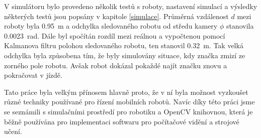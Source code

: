\documentclass[twoside]{ctuthesis}
\theoremstyle{plain}
\theoremstyle{definition}
\theoremstyle{note}
\begin{document}
V simulátoru bylo provedeno několik testů s roboty, nastavení simulací a výsledky některých testů jsou popsány v kapitole \ref{simulace}. Průměrná vzdálenost $d$ mezi roboty byla \SI{0.95}{\meter} a odchylka sledovaného robotu od středu kamery $\phi$ stanovila \SI{0.0023}{\radian}. Dále byl spočítán rozdíl mezi reálnou a vypočtenou pomocí Kalmanova filtru polohou sledovaného robotu, ten stanovil \SI{0.32}{\meter}. Tak velká odchylka byla způsobena tím, že byly simulovány situace, kdy značka zmizí ze zorného pole robotu. Avšak robot dokázal pokaždé najít značku znovu a pokračovat v jízdě. 	


Tato práce byla velkým přínosem hlavně proto, že v ní byla možnost vyzkoušet různé techniky používané pro řízení mobilních robotů. Navíc díky této práci jsme se seznámili s simulačními prostředí pro robotiku a OpenCV knihovnou, která je běžně používána pro implementaci softwaru pro počítačové vidění a strojové učení.


\appendix
\iffalse
\end{document}
